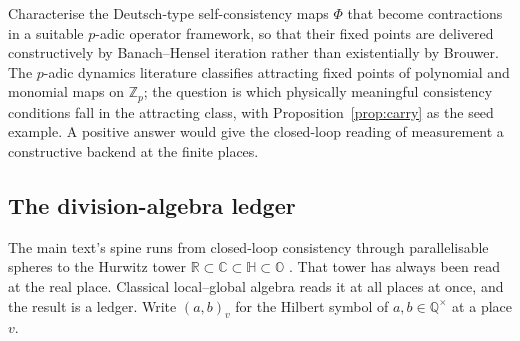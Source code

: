 \begin{openproblem}\label{op:padic-hensel}
Characterise the Deutsch-type self-consistency maps $\Phi$ that become contractions in
a suitable $p$-adic operator framework, so that their fixed points are delivered
constructively by Banach--Hensel iteration rather than existentially by Brouwer. The
$p$-adic dynamics literature \autocite{khrennikovnilsson2004} classifies attracting
fixed points of polynomial and monomial maps on $\mathbb{Z}_p$; the question is which
physically meaningful consistency conditions fall in the attracting class, with
Proposition~\ref{prop:carry} as the seed example. A positive answer would give the
closed-loop reading of measurement a constructive backend at the finite places.
\end{openproblem}

\subsection{The division-algebra ledger}
\label{app:padic-ledger}

The main text's spine runs from closed-loop consistency through parallelisable spheres
to the Hurwitz tower $\mathbb{R} \subset \mathbb{C} \subset \mathbb{H} \subset
\mathbb{O}$ \autocite{hurwitz1898, adams1960}. That tower has always been read at the
real place. Classical local--global algebra reads it at all places at once, and the
result is a ledger. Write $(a,b)_v$ for the Hilbert symbol of
$a, b \in \mathbb{Q}^{\times}$ at a place $v$.

